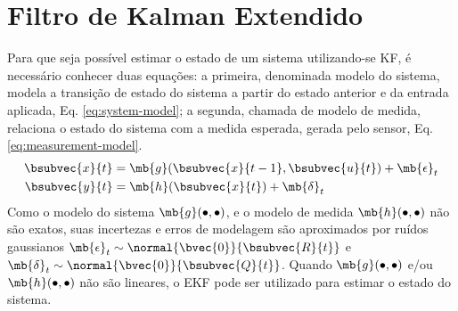 \section{Filtro de Kalman Extendido}
\label{sec:ekf}
Para que seja possível estimar o estado de um sistema utilizando-se KF, é 
necessário conhecer duas equações: a primeira, denominada modelo do sistema, 
modela a transição de estado do sistema a partir do estado anterior e da entrada aplicada, Eq. \ref{eq:system-model}; a segunda, chamada de modelo de medida, relaciona o estado do sistema com a medida esperada, gerada pelo sensor, Eq. \ref{eq:measurement-model}. 
\begin{align}
  \bsubvec{x}{t} &= \mb{g}(\bsubvec{x}{t-1}, \bsubvec{u}{t}) + \mb{\epsilon}_t
  \label{eq:system-model}\\
  \bsubvec{y}{t} &= \mb{h}(\bsubvec{x}{t}) + \mb{\delta}_t
  \label{eq:measurement-model}
\end{align}
Como o modelo do sistema $\mb{g}(\mathord{\bullet}, \mathord{\bullet})$, e o modelo de medida $\mb{h}(\mathord{\bullet}, \mathord{\bullet})$ não são exatos, suas incertezas e erros de modelagem são aproximados por ruídos gaussianos $\mb{\epsilon}_t \sim \normal{\bvec{0}}{\bsubvec{R}{t}}$ e $\mb{\delta}_t \sim \normal{\bvec{0}}{\bsubvec{Q}{t}}$. Quando $\mb{g}(\mathord{\bullet}, \mathord{\bullet})$ e/ou $\mb{h}(\mathord{\bullet}, \mathord{\bullet})$ não são lineares, o EKF pode ser utilizado para estimar o estado 
do sistema. 

